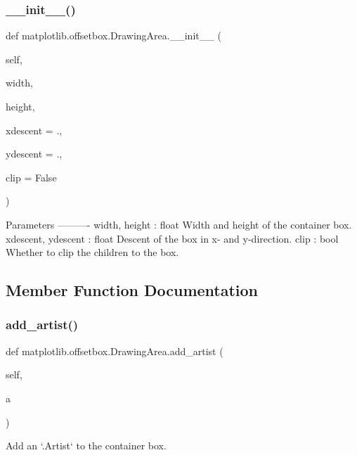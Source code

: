 \subsubsection{\texorpdfstring{\+\_\+\+\_\+init\+\_\+\+\_\+()}{\_\_init\_\_()}}
{\footnotesize\ttfamily def matplotlib.\+offsetbox.\+Drawing\+Area.\+\_\+\+\_\+init\+\_\+\+\_\+ (\begin{DoxyParamCaption}\item[{}]{self,  }\item[{}]{width,  }\item[{}]{height,  }\item[{}]{xdescent = {.},  }\item[{}]{ydescent = {.},  }\item[{}]{clip = {\ttfamily False} }\end{DoxyParamCaption})}

\begin{DoxyVerb}Parameters
----------
width, height : float
    Width and height of the container box.
xdescent, ydescent : float
    Descent of the box in x- and y-direction.
clip : bool
    Whether to clip the children to the box.
\end{DoxyVerb}
 

\subsection{Member Function Documentation}
\mbox{\label{classmatplotlib_1_1offsetbox_1_1DrawingArea_a664a1f6b7e0d723c4e757487551b0ab8}} 
\subsubsection{\texorpdfstring{add\+\_\+artist()}{add\_artist()}}
{\footnotesize\ttfamily def matplotlib.\+offsetbox.\+Drawing\+Area.\+add\+\_\+artist (\begin{DoxyParamCaption}\item[{}]{self,  }\item[{}]{a }\end{DoxyParamCaption})}

\begin{DoxyVerb}Add an `.Artist` to the container box.\end{DoxyVerb}
 \mbox{\label{classmatplotlib_1_1offsetbox_1_1DrawingArea_a7a8a48915b761e4f5a176c44ebfcfb5c}} 

